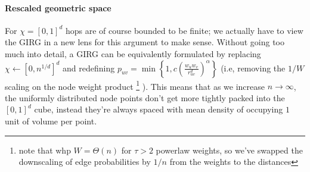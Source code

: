 \paragraph{Rescaled geometric space}
For $\chi = [0,1]^d$ hops are of course bounded to be finite; we actually have to view the GIRG in a new lens for this argument to make sense.
Without going too much into detail, a GIRG can be equivalently formulated by replacing $\chi \gets [0, n^{1/d}]^d$ and redefining $p_{uv} = \min \left \{ 1, c \left ( \frac{w_u w_v}{r_{uv}^d} \right )^\alpha \right \}$ (i.e, removing the $1/W$ scaling on the node weight product
  \footnote{note that whp $W = \Theta(n)$ for $\tau > 2$ powerlaw weights, so we've swapped the downscaling of edge probabilities by $1/n$ from the weights to the distances}
).
This means that as we increase $n \to \infty$, the uniformly distributed node points don't get more tightly packed into the $[0, 1]^d$ cube, instead they're always spaced with mean density of occupying $1$ unit of volume per point.




